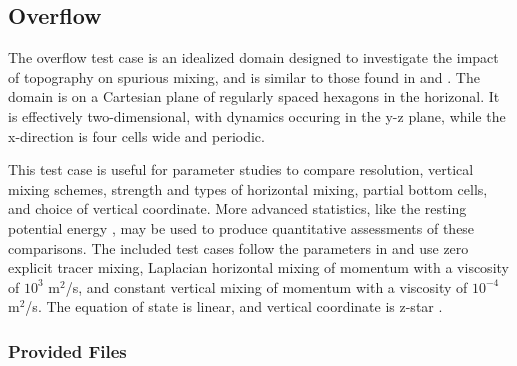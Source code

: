 \subsection{Overflow}
\label{subsec:overflow_description}
The overflow test case is an idealized domain designed to investigate the impact of topography on spurious mixing, and is similar to those found in \citet{Haidvogel_Beckmann99bk} and \citet[section 4]{Ilicak_ea12om}.  The domain is on a Cartesian plane of regularly spaced hexagons in the horizonal.  It is effectively two-dimensional, with dynamics occuring in the y-z plane, while the x-direction is four cells wide and periodic.  

This test case is useful for parameter studies to compare resolution, vertical mixing schemes, strength and types of horizontal mixing, partial bottom cells, and choice of vertical coordinate.  More advanced statistics, like the resting potential energy \citep{Ilicak_ea12om}, may be used to produce quantitative assessments of these comparisons.  The included test cases follow the parameters in \citet[section 4]{Ilicak_ea12om} and use zero explicit tracer mixing, Laplacian horizontal mixing of momentum with a viscosity of $10^3$ m$^2$/s, and constant vertical mixing of momentum with a viscosity of $10^{-4}$ m$^2$/s.  The equation of state is linear, and vertical coordinate is z-star \citep{Adcroft_Campin04om}.


\subsubsection{Provided Files}
\label{subsubsec:overflow_files}

